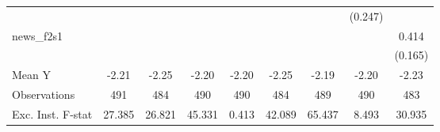 {\begin{tabular}{l*{8}{c}}
            &                     &                     &                     &                     &                     &                     &     (0.247)         &                     \\
\addlinespace
news\_f2s1   &                     &                     &                     &                     &                     &                     &                     &       0.414\sym{**} \\
            &                     &                     &                     &                     &                     &                     &                     &     (0.165)         \\
\midrule
Mean Y      &       -2.21         &       -2.25         &       -2.20         &       -2.20         &       -2.25         &       -2.19         &       -2.20         &       -2.23         \\
Observations&         491         &         484         &         490         &         490         &         484         &         489         &         490         &         483         \\
Exc. Inst. F-stat&      27.385         &      26.821         &      45.331         &       0.413         &      42.089         &      65.437         &       8.493         &      30.935         \\
\bottomrule
\end{tabular}
}
